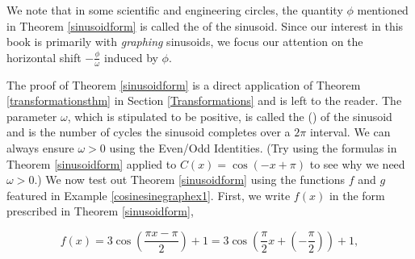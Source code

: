 
\smallskip

We note that in some scientific and engineering circles, the quantity $\phi$ mentioned in Theorem \ref{sinusoidform} is called the   of the sinusoid. Since our interest in this book is primarily with \textit{graphing} sinusoids, we focus our attention on the horizontal shift $-\frac{\phi}{\omega}$ induced by $\phi$.

\smallskip

The proof of Theorem \ref{sinusoidform}  is a direct application of Theorem \ref{transformationsthm} in Section \ref{Transformations} and is left to the reader.  The parameter $\omega$, which is stipulated to be positive, is called the ()   of the sinusoid and is the number of cycles the sinusoid completes over a $2\pi$ interval.  We can always ensure $\omega > 0$ using the Even/Odd Identities. (Try using the formulas in Theorem \ref{sinusoidform} applied to $C(x) = \cos(-x+\pi)$ to see why we need $\omega > 0$.) We now test out Theorem \ref{sinusoidform} using  the functions $f$ and $g$ featured  in Example \ref{cosinesinegraphex1}. First, we write $f(x)$ in the form prescribed in Theorem \ref{sinusoidform},

\[ f(x) =  3 \cos\left(\frac{\pi x - \pi}{2}\right) + 1 = 3\cos\left(\frac{\pi}{2} x + \left(-\frac{\pi}{2}\right)\right) + 1,\]

